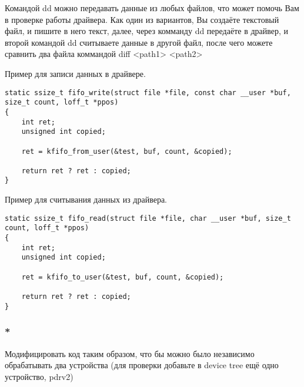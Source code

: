 Командой dd можно передавать данные из любых файлов, что может помочь Вам в проверке работы драйвера. Как один из вариантов, Вы создаёте текстовый файл, и пишите в него текст, далее, через комманду dd передаёте в драйвер, и второй командой dd считываете данные в другой файл, после чего можете сравнить два файла коммандой diff <path1> <path2>

Пример для записи данных в драйвере.
\begin{lstlisting}[style=stdout]
static ssize_t fifo_write(struct file *file, const char __user *buf, size_t count, loff_t *ppos)
{
	int ret;
	unsigned int copied;
	
	ret = kfifo_from_user(&test, buf, count, &copied);
	
	return ret ? ret : copied;
}
\end{lstlisting}


Пример для считывания данных из драйвера.
\begin{lstlisting}[style=stdout]
static ssize_t fifo_read(struct file *file, char __user *buf, size_t count, loff_t *ppos)
{
	int ret;
	unsigned int copied;
	
	ret = kfifo_to_user(&test, buf, count, &copied);
	
	return ret ? ret : copied;
}
\end{lstlisting}

\subsubsection{*} Модифицировать код таким образом, что бы  можно было независимо обрабатывать два устройства (для проверки добавьте в device tree ещё одно устройство, pdrv2)
